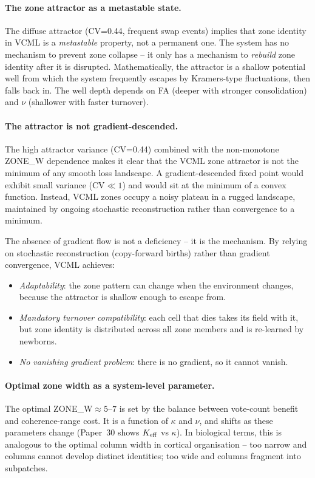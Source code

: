 \documentclass[11pt,a4paper]{article}
\begin{document}
\paragraph{The zone attractor as a metastable state.}
The diffuse attractor (CV=0.44, frequent swap events) implies that zone identity in
VCML is a \emph{metastable} property, not a permanent one.  The system has no mechanism
to prevent zone collapse -- it only has a mechanism to \emph{rebuild} zone identity after
it is disrupted.  Mathematically, the attractor is a shallow potential well from which
the system frequently escapes by Kramers-type fluctuations, then falls back in.  The
well depth depends on FA (deeper with stronger consolidation) and $\nu$ (shallower with
faster turnover).

\paragraph{The attractor is not gradient-descended.}
The high attractor variance (CV=0.44) combined with the non-monotone ZONE\_W dependence
makes it clear that the VCML zone attractor is not the minimum of any smooth loss
landscape.  A gradient-descended fixed point would exhibit small variance (CV$\ll 1$)
and would sit at the minimum of a convex function.  Instead, VCML zones occupy a noisy
plateau in a rugged landscape, maintained by ongoing stochastic reconstruction rather
than convergence to a minimum.

The absence of gradient flow is not a deficiency -- it is the mechanism.  By relying on
stochastic reconstruction (copy-forward births) rather than gradient convergence, VCML
achieves:
\begin{itemize}
  \item \emph{Adaptability}: the zone pattern can change when the environment changes,
    because the attractor is shallow enough to escape from.
  \item \emph{Mandatory turnover compatibility}: each cell that dies takes its field
    with it, but zone identity is distributed across all zone members and is re-learned
    by newborns.
  \item \emph{No vanishing gradient problem}: there is no gradient, so it cannot vanish.
\end{itemize}

\paragraph{Optimal zone width as a system-level parameter.}
The optimal ZONE\_W$\approx 5$--$7$ is set by the balance between vote-count benefit
and coherence-range cost.  It is a function of $\kappa$ and $\nu$, and shifts as these
parameters change (Paper~30 shows $K_{\rm eff}$ vs $\kappa$).  In biological terms, this is
analogous to the optimal column width in cortical organisation -- too narrow and columns
cannot develop distinct identities; too wide and columns fragment into subpatches.
\end{document}
